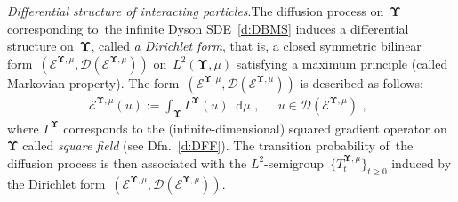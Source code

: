 \documentclass[11pt,letterpaper]{amsart}
\newcommand{\dom}[1]{\mathcal D(#1)}
\newcommand{\diff}{\mathop{}\!\mathrm{d}}
\newcommand{\R}{{\mathbb R}}
\newcommand{\comma}{\,\,\mathrm{,}\;\,}
\newcommand{\cdc}{\Gamma}
\newcommand{\QP}{{\mu}}
\newcommand{\dUpsilon}{{\mathbf \Upsilon}}
\newcommand{\U}{\dUpsilon}
\newcommand{\sine}{\mathsf{sine}}
\newcommand{\E}{\mathcal E}
\renewcommand{\1}{\mathbf 1}
\numberwithin{equation}{section}
\theoremstyle{plain}
\theoremstyle{definition}
\theoremstyle{remark}
\renewcommand{\paragraph}[1]{\medskip\emph{#1}.\quad}
\begin{document}
\paragraph{Differential structure of interacting particles}The diffusion process on~$\U$ corresponding to~the infinite Dyson SDE~\eqref{d:DBMS} induces a differential structure on~$\U$, called {\it a Dirichlet form}, that is,  a closed symmetric bilinear form~$(\E^{\U, \QP}, \dom{\E^{\U, \QP}})$ on~$L^2(\U, \QP)$ satisfying a maximum principle (called Markovian property). The form~$(\E^{\U, \QP}, \dom{\E^{\U, \QP}})$ is described as follows:
\begin{align*}%
\E^{\U, \QP}(u):=\int_{\U}\cdc^{\U}(u) \diff \QP \comma \quad  u \in \dom{\E^{\U, \QP}} \comma
\end{align*}
where $\cdc^\U$ corresponds to the (infinite-dimensional) squared gradient operator on $\U$ called {\it square field} (see Dfn.~\ref{d:DFF}).
The transition probability of~the diffusion process is then associated with the $L^2$-semigroup~$\{T_t^{\U, \QP}\}_{t \ge 0}$ induced by the Dirichlet form~$(\E^{\U, \QP}, \dom{\E^{\U, \QP}})$.
\end{document}
